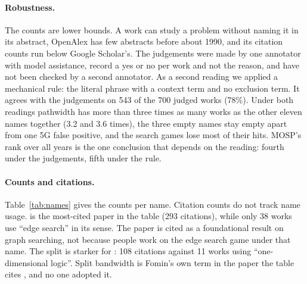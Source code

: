\paragraph{Robustness.} The counts are lower bounds. A work can study a problem
without naming it in its abstract, OpenAlex has few abstracts before about
1990, and its citation counts run below Google Scholar's. The judgements were
made by one annotator with model assistance, record a yes or no per work and not
the reason, and have not been checked by a second annotator. As a second reading
we applied a mechanical rule: the literal phrase with a context term and no
exclusion term. It agrees with the judgements on 543 of the 700 judged works
(78\%). Under both readings pathwidth has more than three times as many works as
the other eleven names together (3.2 and 3.6 times), the three empty names stay
empty apart from one 5G false positive, and the search games lose most of their
hits. MOSP's rank over all years is the one conclusion that depends on the
reading: fourth under the judgements, fifth under the rule.

\begin{table}[t]
\centering\small
\caption{Citations do not track usage: the most-cited papers are cited far
more often than their problem's name is used. Works that use each problem's
name in the sense of the Linhares--Yanasse table, and citations of the paper
the table cites for it.
\emph{Relevant}: hits kept by the relevance check. \emph{Citations}: OpenAlex
\texttt{cited\_by\_count}, 29 September 2026. Kashiwabara and Fujisawa (1979)
has no OpenAlex record. $^{a}$OpenAlex returned one pathwidth record twice: the
counts are of records, as Figure~\ref{fig:names} draws them, and there are 1,212
distinct relevant pathwidth works.}
\label{tab:names}
\resizebox{\linewidth}{!}{}
\end{table}

\paragraph{Counts and citations.} Table~\ref{tab:names} gives the counts per
name. Citation counts do not track name usage. \citet{LY2002ref10} is the
most-cited paper in the table (293 citations), while only 38 works use ``edge
search'' in its sense. The paper is cited as a foundational result on graph
searching, not because people work on the edge search game under that name. The
split is starker for \citet{LY2002ref7}: 108 citations against 11 works using
``one-dimensional logic''. Split bandwidth is Fomin's own term in the paper the
table cites \citep{LY2002ref12}, and no one adopted it.

